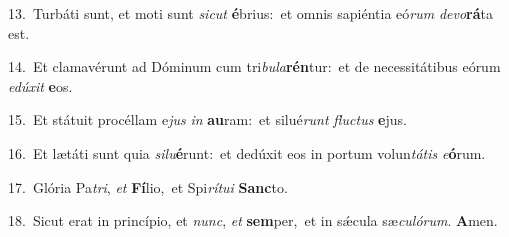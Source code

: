 {\numbfont\textcolor{\numbcolor}{13.}}~Turbáti sunt, et moti sunt \textit{sic}\-\textit{ut} \textbf{é}\-brius:~\star et omnis sapiéntia eó\textit{rum} \textit{de}\-\textit{vo}\textbf{rá}ta est.\par
{\numbfont\textcolor{\numbcolor}{14.}}~Et clamavérunt ad Dóminum cum tri\-\textit{bu}\-\textit{la}\textbf{rén}tur:~\star et de necessitátibus eórum \textit{e}\-\textit{dú}\textit{xit} \textbf{e}\-os.\par
{\numbfont\textcolor{\numbcolor}{15.}}~Et státuit procéllam e\textit{jus} \textit{in} \textbf{au}\-ram:~\star et silué\textit{runt} \textit{fluc}\-\textit{tus} \textbf{e}\-jus.\par
{\numbfont\textcolor{\numbcolor}{16.}}~Et lætáti sunt quia \textit{si}\-\textit{lu}\textbf{é}runt:~\star et dedúxit eos in portum volun\-\textit{tá}\-\textit{tis} \textit{e}\-\textbf{ó}rum.\par
{\numbfont\textcolor{\numbcolor}{17.}}~Glória Pa\-\textit{tri}\-, \textit{et} \textbf{Fí}\-lio,~\star et Spi\-\textit{rí}\-\textit{tu}\textit{i} \textbf{Sanc}\-to.\par
{\numbfont\textcolor{\numbcolor}{18.}}~Sicut erat in princípio, et \textit{nunc}\-, \textit{et} \textbf{sem}\-per,~\star et in sǽcula sæ\-\textit{cu}\-\textit{ló}\textit{rum}. \textbf{A}\-men.\par
